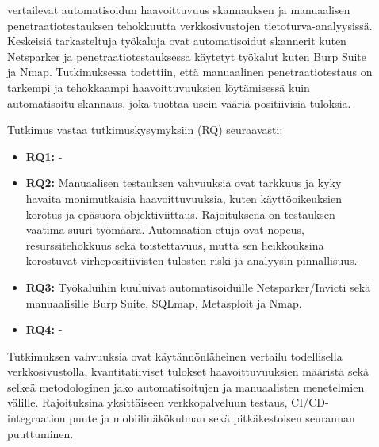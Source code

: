 \documentclass[bscthesis,finnish,oneside,biblatex]{uefcsthesis}
\begin{document}
    \begin{description}
        \item[\cite{rane2024_analysis_scanning}] vertailevat automatisoidun haavoittuvuus skannauksen ja manuaalisen penetraatiotestauksen tehokkuutta verkkosivustojen tietoturva-analyysissä. Keskeisiä tarkasteltuja työkaluja ovat automatisoidut skannerit kuten Netsparker ja penetraatiotestauksessa käytetyt työkalut kuten Burp Suite ja Nmap. Tutkimuksessa todettiin, että manuaalinen penetraatiotestaus on tarkempi ja tehokkaampi haavoittuvuuksien löytämisessä kuin automatisoitu skannaus, joka tuottaa usein vääriä positiivisia tuloksia.

        Tutkimus vastaa tutkimuskysymyksiin (RQ) seuraavasti:
        \begin{itemize}
            \item \textbf{RQ1:} -
            \item \textbf{RQ2:} Manuaalisen testauksen vahvuuksia ovat tarkkuus ja kyky havaita monimutkaisia haavoittuvuuksia, kuten käyttöoikeuksien korotus ja epäsuora objektiviittaus. Rajoituksena on testauksen vaatima suuri työmäärä. Automaation etuja ovat nopeus, resurssitehokkuus sekä toistettavuus, mutta sen heikkouksina korostuvat virhepositiivisten tulosten riski ja analyysin pinnallisuus.
            \item \textbf{RQ3:} Työkaluihin kuuluivat automatisoiduille Netsparker/Invicti sekä manuaalisille Burp Suite, SQLmap, Metasploit ja Nmap.
            \item \textbf{RQ4:} -
        \end{itemize}

        Tutkimuksen vahvuuksia ovat käytännönläheinen vertailu todellisella verkkosivustolla, kvantitatiiviset tulokset haavoittuvuuksien määristä sekä selkeä metodologinen jako automatisoitujen ja manuaalisten menetelmien välille. Rajoituksina yksittäiseen verkkopalveluun testaus, CI/CD-integraation puute ja mobiilinäkökulman sekä pitkäkestoisen seurannan puuttuminen.
    \end{description}
\end{document}
